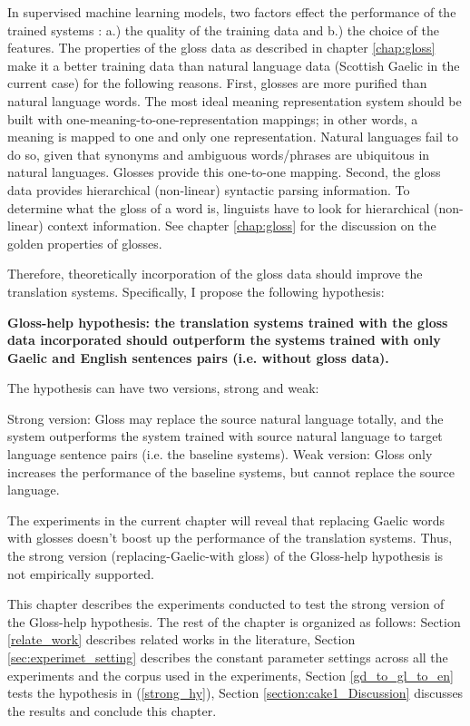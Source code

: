 \documentclass[final]{ua-thesis}
\numberwithin{equation}{section}
\begin{document}
In supervised machine learning models, two factors effect the performance of the trained systems \citep{kotsiantis2007supervised}: a.) the quality of the training data and b.) the choice of the features. The properties of the gloss data as described in chapter \ref{chap:gloss} make it a better training data than natural language data (Scottish Gaelic in the current case) for the following reasons. First, glosses are more purified than natural language words. The most ideal meaning representation system should be built with one-meaning-to-one-representation mappings; in other words, a meaning is mapped to one and only one representation. Natural languages fail to do so, given that synonyms and ambiguous words/phrases are ubiquitous in natural languages. Glosses provide this one-to-one mapping. Second, the gloss data provides hierarchical (non-linear) syntactic parsing information. To determine what the gloss of a word is, linguists have to look for hierarchical (non-linear) context information. See chapter \ref{chap:gloss} for the discussion on the golden properties of glosses.  

Therefore, theoretically incorporation of the gloss data should improve the translation systems. Specifically, I propose the following hypothesis:
\begin{exe} 
\ex \label{gloss_helps_hypothesis}\textbf{Gloss-help hypothesis: the translation systems trained with the gloss data incorporated should outperform the systems trained with only Gaelic and English sentences pairs (i.e. without gloss data).}

The hypothesis can have two versions, strong and weak:
	\begin{xlist}
	\ex \label{strong_hy} Strong version: Gloss may replace the source natural language totally, and the system outperforms the system trained with source natural language to target language sentence pairs (i.e. the baseline systems).  
	\ex \label{weak_hy} Weak version: Gloss only increases the performance of the baseline systems, but cannot replace the source language.
	\end{xlist}
\end{exe}

The experiments in the current chapter will reveal that replacing Gaelic words with glosses doesn't boost up the performance of the translation systems. Thus, the strong version (replacing-Gaelic-with gloss) of the Gloss-help hypothesis is not empirically supported. 

This chapter describes the experiments conducted to test the strong version of the Gloss-help hypothesis.
The rest of the chapter is organized as follows: Section \ref{relate_work} describes related works in the literature, Section \ref{sec:experimet_setting} describes the constant parameter settings across all the experiments and the corpus used in the experiments, Section \ref{gd_to_gl_to_en} tests the hypothesis in (\ref{strong_hy}), Section \ref{section:cake1_Discussion} discusses the results and conclude this chapter.
\end{document}
